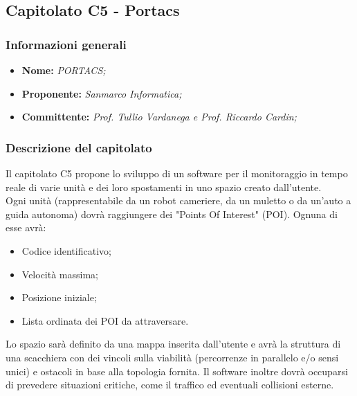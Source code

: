 \subsection{Capitolato C5 - Portacs}
\subsubsection{Informazioni generali}
	\begin{itemize}
	\item \textbf{Nome:} \textit{PORTACS;}
	\item \textbf{Proponente:} \textit{Sanmarco Informatica;}
	\item \textbf{Committente:}  \textit{Prof. Tullio Vardanega e Prof. Riccardo Cardin;}
	\end{itemize}
\subsubsection{Descrizione del capitolato}
Il capitolato C5 propone lo sviluppo di un software per il monitoraggio in tempo reale di varie unità e dei loro spostamenti in uno spazio creato dall'utente. \\
Ogni unità (rappresentabile da un robot cameriere, da un muletto o da un'auto a guida autonoma) dovrà raggiungere dei "Points Of Interest" (POI).
Ognuna di esse avrà: 
\begin{itemize}
	\item Codice identificativo;
	\item Velocità massima;
	\item Posizione iniziale;
	\item Lista ordinata dei POI da attraversare.
\end{itemize}
Lo spazio sarà definito da una mappa inserita dall'utente e avrà la struttura di una scacchiera con dei vincoli sulla viabilità (percorrenze in parallelo e/o sensi unici) e ostacoli in base alla topologia fornita.
Il software inoltre dovrà occuparsi di prevedere situazioni critiche, come il traffico ed eventuali collisioni esterne.

